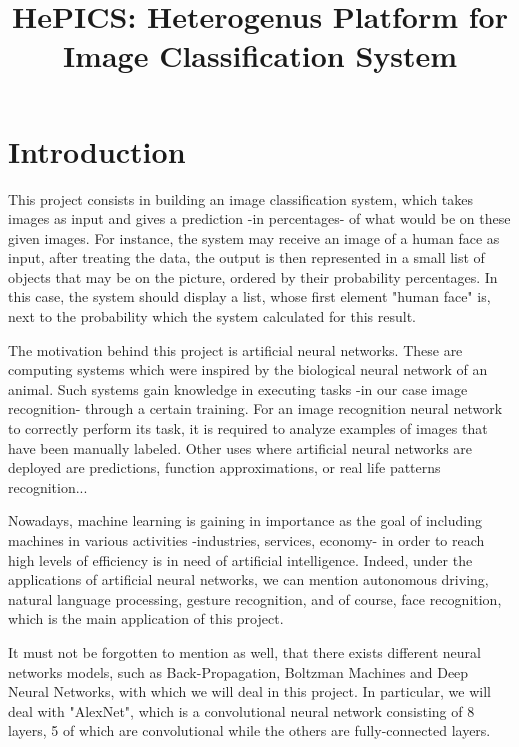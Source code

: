 \documentclass[parskip=full]{scrartcl}
\title{HePICS: Heterogenus Platform for Image Classification System}
\begin{document}
\maketitle
\thispagestyle{empty}
\pagebreak





\tableofcontents
\pagebreak





\section {Introduction}

This project consists in building an image classification system, which takes images as input and gives a prediction -in percentages- of what would be on these given images. For instance, the system may receive an image of a human face as input, after treating the data, the output is then represented in a small list of objects that may be on the picture, ordered by their probability percentages. In this case, the system should display a list, whose first element "human face" is, next to the probability which the system calculated for this result.

The motivation behind this project is artificial neural networks. These are computing systems which were inspired by the biological neural network of an animal. Such systems gain knowledge in executing tasks -in our case image recognition- through a certain training. For an image recognition neural network to correctly perform its task, it is required to analyze examples of images that have been manually labeled. Other uses where artificial neural networks are deployed are predictions, function approximations, or real life patterns recognition...

Nowadays, machine learning is gaining in importance as the goal of including machines in various activities -industries, services, economy- in order to reach high levels of efficiency is in need of artificial intelligence. Indeed, under the applications of artificial neural networks, we can mention autonomous driving, natural language processing, gesture recognition, and of course, face recognition, which is the main application of this project.

It must not be forgotten to mention as well, that there exists different neural networks models, such as Back-Propagation, Boltzman Machines and Deep Neural Networks, with which we will deal in this project. In particular, we will deal with "AlexNet", which is a convolutional neural network consisting of 8 layers, 5 of which are convolutional while the others are fully-connected layers.
\end{document}

